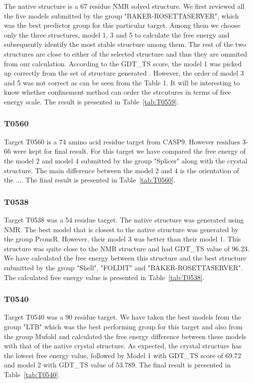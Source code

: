 \documentclass[12pt]{article}
\begin{document}
The native structure is a  67 residue NMR solved structure. We first reviewed all the five models
submitted by the group "BAKER-ROSETTASERVER", which was the best predictor group for this particular
target.  Among them we choose only the three structures, model 1, 3 and 5 to calculate the free
energy and subsequently identify the most stable structure among them. The rest of the two
structures are close to either of the selected structure and thus they are ommited from our
calculation. According to the GDT\_TS score, the model 1 was picked up correctly from the set of
structure generated . However, the order of model 3 and 5 was not correct as can be seen from the
Table 1. It will be interesting to know whether confinement method can order the strcutures in terms
of free energy scale. The result is presented in Table~\protect\ref{tab:T0559}.


\subsubsection{T0560}

Target T0560 is a 74 amino acid residue target from CASP9. However residues 3-66 were kept for final
result.  For this target we have compared the free energy of the model 2 and model 4 submitted by
the group "Splicer" along with the crystal structure.  The main difference between the model 2 and 4
is the orientation of the ....  The final result is presented in Table~\protect\ref{tab:T0560}.

\subsubsection{T0538}

Target T0538 was a 54 residue target. The native structure was generated using NMR. The best model
that is closest to the native structure was generated by the group PconsR. However, their model 3
was better than their model 1. This structure was quite close to the NMR structure and had GDT\_TS
value of 96.23. We have calculated the free energy between this structure and the best structure
submitted by the group "Shell", "FOLDIT" and "BAKER-ROSETTASERVER". The calculated free energy value
is presented in Table~\protect\ref{tab:T0538}.

\subsubsection{T0540}

Target T0540 was a 90 residue target. We have taken the best models from the group "LTB" which was
the best performing group for this target and also from the group Mufold and calculated the free
energy difference between these models with that of the native crystal structure.  As expected, the
crystal structure has the lowest free energy value, followed by Model 1 with GDT\_TS score of
$69.72$ and model 2 with GDT\_TS value of $53.789$. The final result is presented in
Table~\protect\ref{tab:T0540}.
\end{document}
